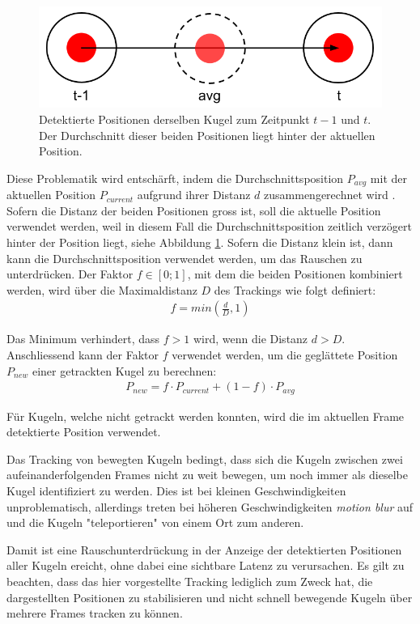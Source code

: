 \begin{figure}[h!]
    \begin{center}
        \includegraphics[width=0.6\linewidth]{../common/03_billiard_ai/resources/tracking_moving_average_for_moving_balls.png}
    \end{center}
    \caption{Detektierte Positionen derselben Kugel zum Zeitpunkt $t-1$ und $t$. Der Durchschnitt dieser beiden Positionen liegt hinter der aktuellen Position.}
    \label{fig:tracking_moving_average_for_moving_balls}
\end{figure}

Diese Problematik wird entschärft, indem die Durchschnittsposition $P_{avg}$ mit der aktuellen Position $P_{current}$
aufgrund ihrer Distanz $d$ zusammengerechnet wird \cite{learnopencv:stabilizing_landmarks_in_videos}.
Sofern die Distanz der beiden Positionen gross ist, soll die aktuelle Position verwendet werden, weil in diesem Fall
die Durchschnittsposition zeitlich verzögert hinter der Position liegt, siehe Abbildung \ref{fig:tracking_moving_average_for_moving_balls}.
Sofern die Distanz klein ist, dann kann die Durchschnittsposition verwendet werden, um das Rauschen zu unterdrücken.
Der Faktor $f \in [0; 1]$, mit dem die beiden Positionen kombiniert werden, wird über die Maximaldistanz $D$ des Trackings wie folgt definiert:
\begin{align}
    f = min(\frac{d}{D}, 1)
\end{align}

Das Minimum verhindert, dass $f > 1$ wird, wenn die Distanz $d > D$.
Anschliessend kann der Faktor $f$ verwendet werden, um die geglättete Position $P_{new}$ einer getrackten Kugel zu berechnen:
\begin{align}
    P_{new} = f \cdot P_{current} + (1 - f) \cdot P_{avg}
\end{align}

Für Kugeln, welche nicht getrackt werden konnten, wird die im aktuellen Frame detektierte Position verwendet.

Das Tracking von bewegten Kugeln bedingt, dass sich die Kugeln zwischen zwei aufeinanderfolgenden Frames nicht zu weit
bewegen, um noch immer als dieselbe Kugel identifiziert zu werden.
Dies ist bei kleinen Geschwindigkeiten unproblematisch, allerdings treten bei höheren Geschwindigkeiten
\emph{motion blur} auf und die Kugeln "teleportieren" von einem Ort zum anderen.

Damit ist eine Rauschunterdrückung in der Anzeige der detektierten Positionen aller Kugeln ereicht, ohne dabei eine
sichtbare Latenz zu verursachen.
Es gilt zu beachten, dass das hier vorgestellte Tracking lediglich zum Zweck hat, die dargestellten Positionen zu stabilisieren
und nicht schnell bewegende Kugeln über mehrere Frames tracken zu können.


